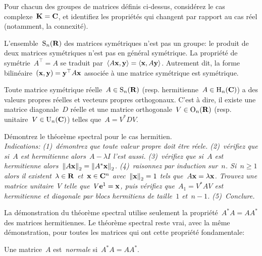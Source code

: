 \begin{exercice}
	Pour chacun des groupes de matrices définis ci-dessus, considérez
	le cas complexe~$\mathbf{K}=\mathbf{C}$, et identifiez les propriétés qui changent par
	rapport au cas réel (notamment, la connexité).
\end{exercice}

L'ensemble~$\mathrm{S}_n(\mathbf{R})$ des matrices symétriques n'est pas un groupe: le produit
de deux matrices symétriques n'est pas en général symétrique.  La propriété
de symétrie~$A^\top=A$ se traduit par~$\left\langle A\mathbf{x},\mathbf{y}\right\rangle=\left\langle \mathbf{x},A\mathbf{y}\right\rangle$.
Autrement dit, la forme bilinéaire~$(\mathbf{x},\mathbf{y})=\mathbf{y}^\top A\mathbf{x}$
associée à une matrice symétrique est symétrique.

\begin{proposition}
	Toute matrice symétrique réelle~$A\in\mathrm{S}_n(\mathbf{R})$ (resp. hermitienne~$A\in
	\mathrm{H}_n(\mathbf{C})$) a des valeurs propres réelles et vecteurs propres orthogonaux.
	C'est à dire, il existe une matrice diagonale~$D$ réelle et une matrice
	orthogonale~$V\in\mathrm{O}_n(\mathbf{R})$ (resp.  unitaire~$V\in\mathrm{U}_n(\mathbf{C})$) telles
	que~$A=V^* D V$.
\end{proposition}

\begin{exercice}
	Démontrez le théorème spectral pour le cas hermitien.\\
	\emph{
	Indications: (1)~démontrez que toute valeur propre doit être réele.
	(2)\!~vérifiez que si~$A$ est hermitienne alors~$A-\lambda I$ l'est aussi.
	(3)\!~vérifiez que si~$A$ est hermitienne
	alors~$\left\|A\mathbf{x}\right\|_2=\left\|A^*\mathbf{x}\right\|_2$.
	(4)\!~raisonnez par induction sur~$n$.  Si~$n\ge 1$ alors il
	existent~$\lambda\in\mathbf{R}$ et~$\mathbf{x}\in\mathbf{C}^n$ avec~$\left\|\mathbf{x}\right\|_2=1$ tels
	que~$A\mathbf{x}=\lambda\mathbf{x}$.  Trouvez une matrice unitaire~$V$ telle
	que~$V\mathbf{e}^1=\mathbf{x}$, puis vérifiez que~$A_1=V^*AV$ est hermitienne et diagonale
	par blocs hermitiens de taille~$1$ et~$n-1$.
	(5)\!\!~Conclure.
}
\end{exercice}

La démonstration du théorème spectral utilise seulement la
propriété~$A^*A=AA^*$ des matrices hermitiennes.  Le théorème spectral reste
vrai, avec la même démonstration, pour toutes les matrices qui ont cette
propriété fondamentale:

\begin{definition}
	Une matrice~$A$ est~\emph{normale} si~$A^*A=AA^*$.
\end{definition}

